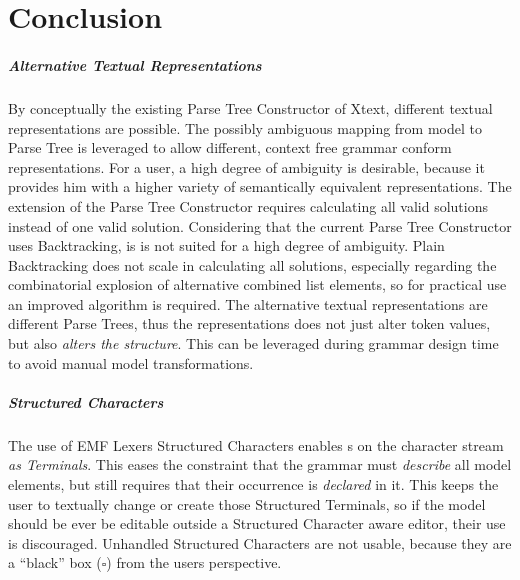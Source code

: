 \chapter{Conclusion}
\paragraph{Alternative Textual Representations}
By conceptually the existing Parse Tree Constructor of Xtext, different textual representations are possible. The possibly ambiguous mapping from model to Parse Tree is leveraged to allow different, context free grammar conform representations. For a user, a high degree of ambiguity is desirable, because it provides him with a higher variety of semantically equivalent representations. The extension of the Parse Tree Constructor requires calculating all valid solutions instead of one valid solution. Considering that the current Parse Tree Constructor uses Backtracking, is is not suited for a high degree of ambiguity. Plain Backtracking does not scale in calculating all solutions, especially regarding the combinatorial explosion of alternative combined list elements, so for practical use an improved algorithm is required. The alternative textual representations are different Parse Trees, thus the representations does not just alter token values, but also \emph{alters the structure}. This can be leveraged during grammar design time to avoid manual model transformations. 

\paragraph{Structured Characters}
The use of EMF Lexers Structured Characters enables s on the character stream \emph{as Terminals}. This eases the constraint that the grammar must \emph{describe} all model elements, but still requires that their occurrence is \emph{declared} in it. This keeps the user to textually change or create those Structured Terminals, so if the model should be ever be editable outside a Structured Character aware editor, their use is discouraged. Unhandled Structured Characters are not usable, because they are a ``black'' box ($\square$) from the users perspective.

